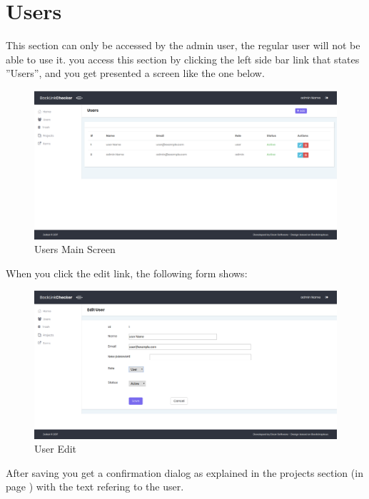 \section{Users}
This section can only be accessed by the admin user, the regular user will not be able to use it. you access this section by clicking the left side bar link that states ''Users'', and you get presented a screen like the one below.
\begin{figure}[H]
	\caption{Users Main Screen}
	\label{img:usrmain}
	\includegraphics[width=\textwidth]{images/users_screenshot}
\end{figure}

When you click the edit link, the following form shows:
\begin{figure}[H]
	\caption{User Edit}
	\label{img:usredit}
	\includegraphics[width=\textwidth]{images/users_edit}
\end{figure}

After saving you get a confirmation dialog as explained in the projects section (in page \pageref{img:confirm}) with the text refering to the user.

